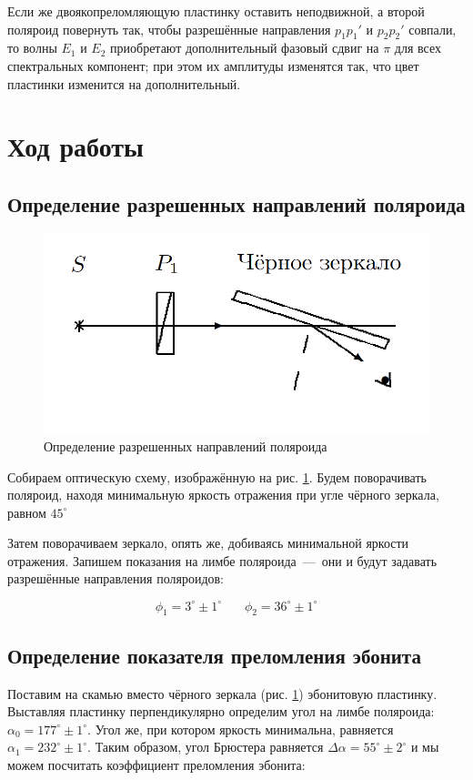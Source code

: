 \documentclass[a4paper,12pt]{article}
\begin{document}
Если же двоякопреломляющую пластинку оставить неподвижной, а второй поляроид повернуть так, чтобы разрешённые направления $ p_1p_1' $ и $ p_2p_2' $ совпали, то волны $ E_1 $ и $ E_2 $ приобретают дополнительный фазовый сдвиг на $ \pi $ для всех спектральных компонент; при этом их амплитуды изменятся так, что цвет пластинки изменится на дополнительный. 

\clearpage

\section*{Ход работы}

\subsection*{Определение разрешенных направлений поляроида}

\begin{figure}[h] 
	\centering
	\includegraphics[width=0.3\linewidth]{5}
	\caption{Определение разрешенных направлений поляроида}
	\label{ris 5}
\end{figure}

Собираем оптическую схему, изображённую на рис. \ref{ris 5}. Будем поворачивать поляроид, находя минимальную яркость отражения при угле чёрного зеркала, равном $45^\circ$ 

Затем поворачиваем зеркало, опять же, добиваясь минимальной яркости отражения. Запишем показания на лимбе поляроида~---~они и будут задавать разрешённые направления поляроидов:

\[\phi_1 = 3^\circ \pm 1^\circ \ \ \ \ \ \ \ \ \phi_2 = 36^\circ \pm 1^\circ\]

\subsection*{Определение показателя преломления эбонита}

Поставим на скамью вместо чёрного зеркала (рис. \ref{ris 5}) эбонитовую
пластинку. Выставляя пластинку перпендикулярно определим угол на лимбе поляроида: $\alpha_0 = 177^\circ \pm 1^\circ$. Угол же, при котором яркость минимальна, равняется $\alpha_1 = 232^\circ \pm 1^\circ$. Таким образом, угол Брюстера равняется $\Delta \alpha = 55^\circ \pm 2^\circ$ и мы можем посчитать коэффициент преломления эбонита:
\end{document}
